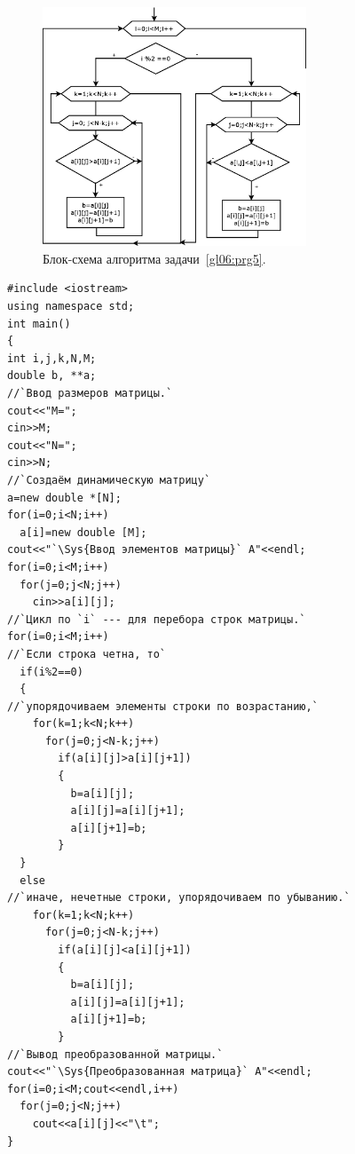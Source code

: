 \begin{figure}[htb]
\begin{center}
\includegraphics[width=0.7\textwidth]{img/ris_6_10}
\caption{Блок-схема алгоритма задачи~\ref{gl06:prg5}.}
\label{ch06:refDrawing9}
\end{center}
\end{figure}

\begin{lstlisting}
#include <iostream>
using namespace std;
int main()
{
int i,j,k,N,M;
double b, **a; 
//`Ввод размеров матрицы.` 
cout<<"M=";
cin>>M;
cout<<"N=";
cin>>N;
//`Создаём динамическую матрицу`
a=new double *[N];
for(i=0;i<N;i++)
  a[i]=new double [M];
cout<<"`\Sys{Ввод элементов матрицы}` A"<<endl;
for(i=0;i<M;i++)
  for(j=0;j<N;j++)
    cin>>a[i][j];
//`Цикл по `i` --- для перебора строк матрицы.`
for(i=0;i<M;i++)
//`Если строка четна, то`
  if(i%2==0)
  {
//`упорядочиваем элементы строки по возрастанию,`
    for(k=1;k<N;k++)
      for(j=0;j<N-k;j++)
        if(a[i][j]>a[i][j+1])
        {
          b=a[i][j];
          a[i][j]=a[i][j+1];
          a[i][j+1]=b;
        }
  }
  else
//`иначе, нечетные строки, упорядочиваем по убыванию.`
    for(k=1;k<N;k++)
      for(j=0;j<N-k;j++)
        if(a[i][j]<a[i][j+1])
        {
          b=a[i][j];
          a[i][j]=a[i][j+1];
          a[i][j+1]=b;
        }
//`Вывод преобразованной матрицы.`
cout<<"`\Sys{Преобразованная матрица}` A"<<endl;
for(i=0;i<M;cout<<endl,i++)
  for(j=0;j<N;j++)
    cout<<a[i][j]<<"\t";
}
\end{lstlisting}


